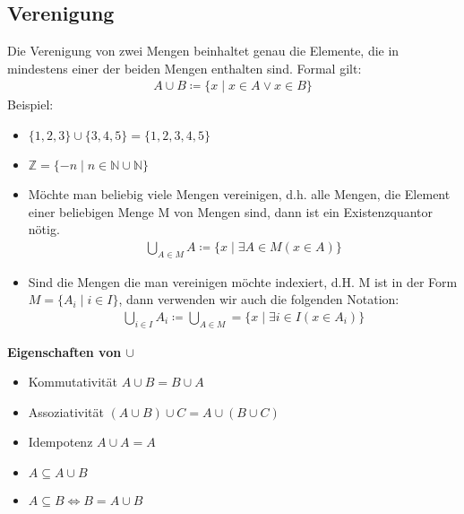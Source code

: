 \subsection{Verenigung}
Die Verenigung von zwei Mengen beinhaltet genau die Elemente, die in mindestens einer der beiden Mengen enthalten sind. Formal gilt:
\begin{align*}
A \cup B \coloneqq \{x \mid x \in A \vee x \in B\}
\end{align*}
Beispiel:
\begin{itemize}
    \item $\{1,2,3\} \cup \{3,4,5\} = \{1,2,3,4,5\}$
    \item $\mathbb{Z} = \{-n \mid n \in \mathbb{N} \cup \mathbb{N}\}$
\end{itemize}
\begin{itemize}
    \item Möchte man beliebig viele Mengen vereinigen, d.h. alle
    Mengen, die Element einer beliebigen Menge M von Mengen
    sind, dann ist ein Existenzquantor nötig.
    \begin{align*}
        \bigcup_{A \in M} A \coloneqq \{x \mid \exists{A} \in M(x \in A)\}
    \end{align*}
    \item Sind die Mengen die man vereinigen möchte indexiert, d.H. M ist in der Form $M = \{A_i \mid i \in I\}$,
    dann verwenden wir auch die folgenden Notation:
    \begin{align*}
        \bigcup_{i \in I} A_i \coloneqq \bigcup_{A \in M} = \{x \mid \exists{i} \in I(x \in A_i)\}
    \end{align*}
\end{itemize}

{\bf Eigenschaften von $\cup$}
\begin{itemize}
    \item Kommutativität $A \cup B = B \cup A$
    \item Assoziativität $(A \cup B) \cup C = A \cup (B \cup C)$
    \item Idempotenz $A \cup A = A$
    \item $A \subseteq A \cup B$
    \item $A \subseteq B \Leftrightarrow B = A \cup B$
\end{itemize}

